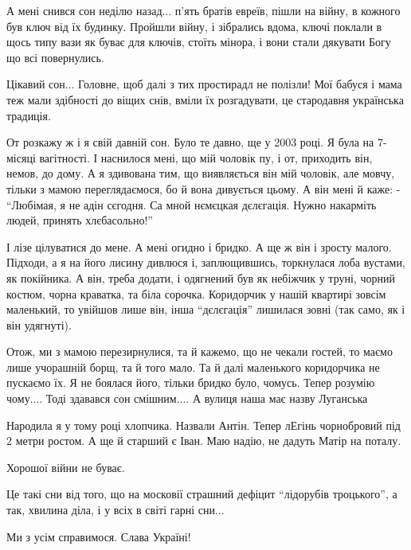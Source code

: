 \begin{itemize}

А мені снився сон неділю назад... п'ять братів евреїв, пішли на війну, в кожного
був ключ від їх будинку. Пройшли війну, і зібрались вдома, ключі поклали в щось
типу вази як буває для ключів, стоїть мінора, і вони стали дякувати Богу що всі
повернулись.


Цікавий сон... Головне, щоб далі з тих простирадл не полізли! Мої бабуся і мама
теж мали здібності до віщих снів, вміли їх розгадувати, це стародавня
українська традиція.


От розкажу ж і я свій давній сон. Було те давно, ще у 2003 році. Я була на
7-місяці вагітності. І наснилося мені, що мій чоловік пу, і от, приходить він,
немов, до дому. А я здивована тим, що виявляється він мій чоловік, але мовчу,
тільки з мамою переглядаємося, бо й вона дивується цьому. А він мені й
каже: - \enquote{Любімая, я не адін сєгодня. Са мной нємєцкая дєлєгація. Нужно накарміть
людей, принять хлєбасольно!}

І лізе цілуватися до мене. А мені огидно і бридко. А ще ж він і зросту малого.
Підходи, а я на його лисину дивлюся і, заплющившись, торкнулася лоба вустами,
як покійника. А він, треба додати, і одягнений був як небіжчик у труні, чорний
костюм, чорна краватка, та біла сорочка. Коридорчик у нашій квартирі зовсім
маленький, то увійшов лише він, інша \enquote{дєлєгація} лишилася зовні (так
само, як і він удягнуті).

Отож, ми з мамою перезирнулися, та й кажемо, що не чекали гостей, то маємо лише
учорашній борщ, та й того мало. Та й далі маленького коридорчика не пускаємо
їх. Я не боялася його, тільки бридко було, чомусь. Тепер розумію чому.... Тоді
здавався сон смішним.... А вулиця наша має назву Луганська

Народила я у тому році хлопчика. Назвали Антін. Тепер лЕгінь чорнобровий під 2
метри ростом. А ще й старший є Іван. Маю надію, не дадуть Матір на поталу.

Хорошої війни не буває.


Це такі сни від того, що на московії страшний дефіцит \enquote{лідорубів
троцького}, а так, хвилина діла, і у всіх в світі гарні сни...

Ми з усім справимося. Слава Україні!



\end{itemize}
